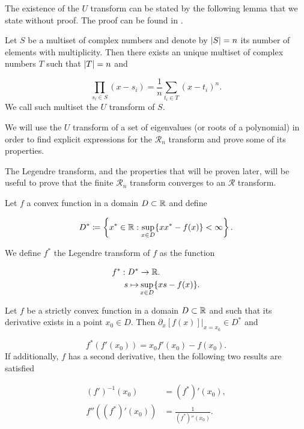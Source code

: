 The existence of the $U$ transform can be stated by the following lemma that we state without proof. The proof can be found in \cite{anaya2016cumulantes}.

\begin{lemma}[$U$ transform]
    Let $S$ be a multiset of complex numbers and denote by $\lvert S \rvert=n$ its number of elements with multiplicity. Then there exists an unique multiset of complex numbers $T$ such that $\lvert T \rvert=n$ and 

    \begin{equation*}
        \prod_{s_i \in S} (x-s_i) = \frac 1n \sum_{t_i \in T} (x-t_i)^n.
    \end{equation*}
    We call such multiset the $U$ transform of $S$.
\end{lemma}

We will use the $U$ transform of a set of eigenvalues (or roots of a polynomial) in order to find explicit expressions for the $\mathcal R_n$ transform and prove some of its properties. 

The Legendre transform, and the properties that will be proven later, will be useful to prove that the finite $\mathcal R_n$ transform converges to an $\mathcal R$ transform.

\begin{definition}
    Let $f$ a convex function in a domain $D\subset \mathbb R$ and define

    \begin{equation} \label{eq:legendre_set}
        D^* \coloneqq \left\{ x^* \in \mathbb R \mathrel{:} \sup_{x \in D} \{xx^* - f(x)\} < \infty \right\}.
    \end{equation}

    We define $f^*$ the Legendre transform of $f$ as the function

    \begin{align*}
        f^* : D^* &\to \mathbb R.\\
        s \mapsto &\sup_{x \in D} \{ xs - f(x) \}.
    \end{align*}
\end{definition}

\begin{lemma} \label{lemma:strictly_convex}
    Let $f$ be a strictly convex function in a domain $D \subset \mathbb R$ and such that its derivative exists in a point $x_0 \in D$. Then $\left.\partial_x [f(x)]\right|_{x=x_0} \in D^*$ and 

    \begin{equation*}
        f^*(f'(x_0)) = x_0 f'(x_0) - f(x_0).
    \end{equation*}
If additionally, $f$ has a second derivative, then the following two results are satisfied

    \begin{align*}
        (f')^{-1}(x_0) &= (f^*)'(x_0), \\
        f''((f^*)'(x_0)) &= \frac{1}{(f^*)''(x_0)}.
    \end{align*}
\end{lemma}


